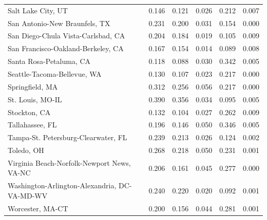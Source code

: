 \documentclass[
  10pt,
]{article}
\begin{document}
\begin{table}
\begin{tabular}{lrrrrr}
Salt Lake City, UT                           &              0.146 &              0.121 &                 0.026 &           0.212 &       0.007 \\
San Antonio-New Braunfels, TX                &              0.231 &              0.200 &                 0.031 &           0.154 &       0.000 \\
San Diego-Chula Vista-Carlsbad, CA           &              0.204 &              0.184 &                 0.019 &           0.105 &       0.009 \\
San Francisco-Oakland-Berkeley, CA           &              0.167 &              0.154 &                 0.014 &           0.089 &       0.008 \\
Santa Rosa-Petaluma, CA                      &              0.118 &              0.088 &                 0.030 &           0.342 &       0.005 \\
Seattle-Tacoma-Bellevue, WA                  &              0.130 &              0.107 &                 0.023 &           0.217 &       0.000 \\
Springfield, MA                              &              0.312 &              0.256 &                 0.056 &           0.217 &       0.000 \\
St. Louis, MO-IL                             &              0.390 &              0.356 &                 0.034 &           0.095 &       0.005 \\
Stockton, CA                                 &              0.132 &              0.104 &                 0.027 &           0.262 &       0.009 \\
Tallahassee, FL                              &              0.196 &              0.146 &                 0.050 &           0.346 &       0.005 \\
Tampa-St. Petersburg-Clearwater, FL          &              0.239 &              0.213 &                 0.026 &           0.124 &       0.002 \\
Toledo, OH                                   &              0.268 &              0.218 &                 0.050 &           0.231 &       0.001 \\
Virginia Beach-Norfolk-Newport News, VA-NC   &              0.206 &              0.161 &                 0.045 &           0.277 &       0.000 \\
Washington-Arlington-Alexandria, DC-VA-MD-WV &              0.240 &              0.220 &                 0.020 &           0.092 &       0.001 \\
Worcester, MA-CT                             &              0.200 &              0.156 &                 0.044 &           0.281 &       0.001 \\
\bottomrule
\end{tabular}
\end{table}
\end{document}
